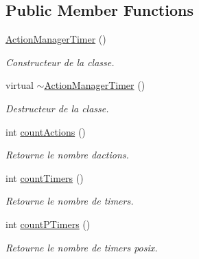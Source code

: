 \subsection*{Public Member Functions}
\begin{DoxyCompactItemize}
\item 
\mbox{\label{classActionManagerTimer_a957a5706d13675e5282372523c2db521}} 
\hyperlink{classActionManagerTimer_a957a5706d13675e5282372523c2db521}{Action\+Manager\+Timer} ()
\begin{DoxyCompactList}\small\item\em Constructeur de la classe. \end{DoxyCompactList}\item 
\mbox{\label{classActionManagerTimer_ad465b1e6b2f352a92cc10bcaf5e6416e}} 
virtual \hyperlink{classActionManagerTimer_ad465b1e6b2f352a92cc10bcaf5e6416e}{$\sim$\+Action\+Manager\+Timer} ()
\begin{DoxyCompactList}\small\item\em Destructeur de la classe. \end{DoxyCompactList}\item 
\mbox{\label{classActionManagerTimer_a6e6db535941463a0e590a6779f111dd2}} 
int \hyperlink{classActionManagerTimer_a6e6db535941463a0e590a6779f111dd2}{count\+Actions} ()
\begin{DoxyCompactList}\small\item\em Retourne le nombre d\textquotesingle{}actions. \end{DoxyCompactList}\item 
\mbox{\label{classActionManagerTimer_af44ca42a2cebadd32062dedf874d4f82}} 
int \hyperlink{classActionManagerTimer_af44ca42a2cebadd32062dedf874d4f82}{count\+Timers} ()
\begin{DoxyCompactList}\small\item\em Retourne le nombre de timers. \end{DoxyCompactList}\item 
\mbox{\label{classActionManagerTimer_ad5a07cffbb588205edcdcb594208769c}} 
int \hyperlink{classActionManagerTimer_ad5a07cffbb588205edcdcb594208769c}{count\+P\+Timers} ()
\begin{DoxyCompactList}\small\item\em Retourne le nombre de timers posix. \end{DoxyCompactList}\item 

\end{DoxyCompactItemize}
